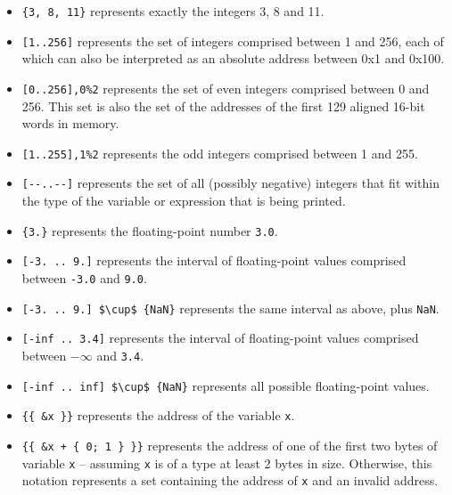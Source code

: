 \documentclass{frama-c-book}
\begin{document}
\begin{itemize}

\item \lstinline|{3, 8, 11}| represents exactly the integers 3, 8 and 11.

\item \lstinline|[1..256]| represents the set of integers comprised between 1 and 256, each of which can also be interpreted as an absolute address between
0x1 and 0x100.

\item \lstinline|[0..256],0%2|
      represents the set of even integers comprised between 0 and 256.
This set is also the set of the addresses of the first 129 aligned 16-bit words
in memory.

\item \lstinline|[1..255],1%2|
      represents the odd integers comprised between 1 and 255.

\item \lstinline|[--..--]| represents the set of all (possibly negative)
integers that fit within the type of the variable or expression that is
being printed.

\item \lstinline|{3.}| represents the floating-point number \lstinline|3.0|.

\item \lstinline|[-3. .. 9.]| represents the interval of floating-point values
comprised between \lstinline|-3.0| and \lstinline|9.0|.

\item \lstinline|[-3. .. 9.] $\cup$ {NaN}| represents the same
  interval as above, plus \lstinline|NaN|.

\item \lstinline|[-inf .. 3.4]| represents the interval of
  floating-point values comprised between $-\infty$ and \lstinline|3.4|.

\item \lstinline|[-inf .. inf] $\cup$ {NaN}| represents
  all possible floating-point values.

\item \lstinline|{{ &x }}| represents the address of the variable \lstinline|x|.

\item \lstinline|{{ &x + { 0; 1 } }}|
  represents the address of one of the first two bytes of variable
      \lstinline|x| -- assuming \lstinline|x| is of a type at least 2 bytes in size.
 Otherwise, this notation represents a set containing the address of
\lstinline|x| and an invalid address.


\end{itemize}
\end{document}
